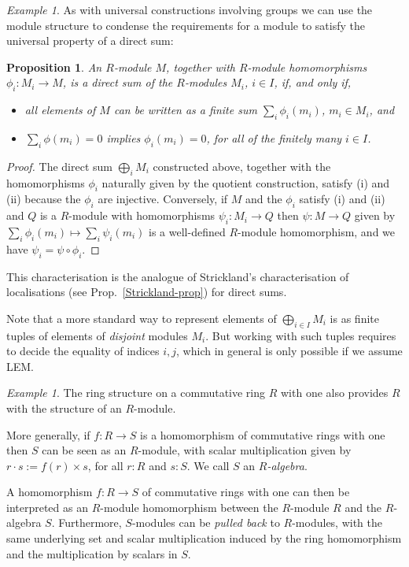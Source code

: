 \documentclass{amsart}
\theoremstyle{plain}
\numberwithin{equation}{section} %
\numberwithin{figure}{section} %
\theoremstyle{plain}
\theoremstyle{plain}
\theoremstyle{plain}
\theoremstyle{plain}
\theoremstyle{plain}
\newtheorem{prop}[thm]{Proposition} %
\theoremstyle{plain}
\theoremstyle{remark}
\theoremstyle{remark}
\theoremstyle{remark}
\newtheorem{exm}[thm]{Example}
\begin{document}
\begin{exm}
As with universal constructions involving groups we can use the module structure to condense the requirements for a module to satisfy the universal property of a direct sum:
\begin{prop}
An $R$-module $M$, together with $R$-module homomorphisms $\phi_i : M_i \rightarrow M$, is a direct sum of the $R$-modules $M_i$, $i \in I$, if, and only if,
\begin{itemize}
\item[(i)] all elements of $M$ can be written as a finite sum $\sum_i \phi_i(m_i)$, $m_i \in M_i$, and 
\item[(ii)] $\sum_i \phi(m_i) = 0$ implies $\phi_i(m_i) = 0$, for all of the finitely many $i \in I$.
\end{itemize}  
\end{prop}
\begin{proof}
The direct sum $\bigoplus_i M_i$ constructed above, together with the homomorphisms $\phi_i$ naturally given by the quotient construction, satisfy (i) and (ii) because the $\phi_i$ are injective. Conversely, if $M$ and the $\phi_i$ satisfy (i) and (ii) and $Q$ is a $R$-module with homomorphisms $\psi_i : M_i \rightarrow Q$ then $\psi : M \rightarrow Q$ given by $\sum_i \phi_i(m_i) \mapsto \sum_i \psi_i(m_i)$ is a well-defined $R$-module homomorphism, and we have $\psi_i = \psi \circ \phi_i$.
\end{proof}

This characterisation is the analogue of Strickland's characterisation of localisations (see Prop.~\ref{Strickland-prop}) for direct sums.

Note that a more standard way to represent elements of $\bigoplus_{i \in I} M_i$ is as finite tuples of elements of \textit{disjoint} modules $M_i$. But working with such tuples requires to decide the equality of indices $i, j$, which in general is only possible if we assume LEM.
\end{exm}

\begin{exm}
The ring structure on a commutative ring $R$ with one also provides $R$ with the structure of an $R$-module.

More generally, if $f : R \rightarrow S$ is a homomorphism of commutative rings with one then $S$ can be seen as an $R$-module, with scalar multiplication given by $r \cdot s := f(r) \times s$, for all $r : R$ and $s : S$. We call $S$ an \textit{$R$-algebra}. 

A homomorphism $f : R \rightarrow S$ of commutative rings with one can then be interpreted as an $R$-module homomorphism between the $R$-module $R$ and the $R$-algebra $S$. Furthermore, $S$-modules can be \textit{pulled back} to $R$-modules, with the same underlying set and scalar multiplication induced by the ring homomorphism and the multiplication by scalars in $S$.
\end{exm}
\end{document}
